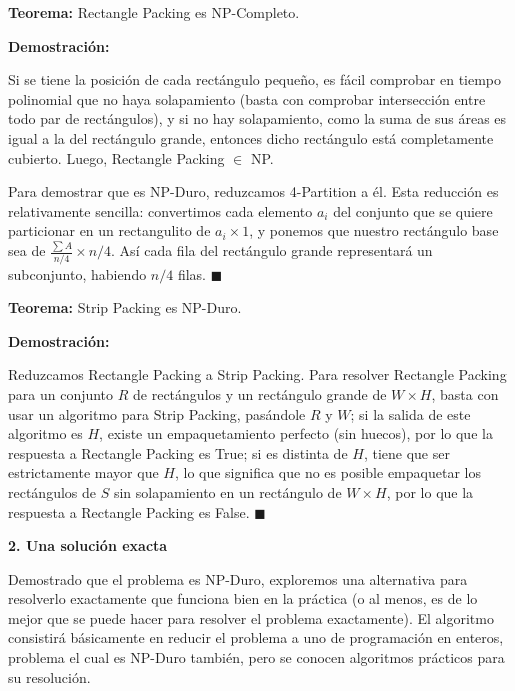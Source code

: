 \documentclass{article}
\begin{document}
\bigskip

\textbf{Teorema:} Rectangle Packing es NP-Completo.

\smallskip

\textbf{Demostración:}

\bigskip

Si se tiene la posición de cada rectángulo pequeño, es fácil comprobar en tiempo polinomial que no haya solapamiento (basta con comprobar intersección entre todo par de rectángulos), y si no hay solapamiento, como la suma de sus áreas es igual a la del rectángulo grande, entonces dicho rectángulo está completamente cubierto. Luego, Rectangle Packing $\in$ NP.

\bigskip

Para demostrar que es NP-Duro, reduzcamos 4-Partition a él. Esta reducción es relativamente sencilla: convertimos cada elemento $a_i$ del conjunto que se quiere particionar en un rectangulito de $a_i \times 1$, y ponemos que nuestro rectángulo base sea de $\frac{\sum A}{n/4} \times n/4$. Así cada fila del rectángulo grande representará un subconjunto, habiendo $n/4$ filas. $\blacksquare$

\bigskip

\textbf{Teorema:} Strip Packing es NP-Duro.

\smallskip

\textbf{Demostración:}

\bigskip

Reduzcamos Rectangle Packing a Strip Packing. Para resolver Rectangle Packing para un conjunto $R$ de rectángulos y un rectángulo grande de $W \times H$, basta con usar un algoritmo para Strip Packing, pasándole $R$ y $W$; si la salida de este algoritmo es $H$, existe un empaquetamiento perfecto (sin huecos), por lo que la respuesta a Rectangle Packing es True; si es distinta de $H$, tiene que ser estrictamente mayor que $H$, lo que significa que no es posible empaquetar los rectángulos de $S$ sin solapamiento en un rectángulo de $W \times H$, por lo que la respuesta a Rectangle Packing es False. $\blacksquare$



\bigskip

\center
\textbf{2. Una solución exacta}

\raggedright
\smallskip

Demostrado que el problema es NP-Duro, exploremos una alternativa para resolverlo exactamente que funciona bien en la práctica (o al menos, es de lo mejor que se puede hacer para resolver el problema exactamente). El algoritmo consistirá básicamente en reducir el problema a uno de programación en enteros, problema el cual es NP-Duro también, pero se conocen algoritmos prácticos para su resolución.
\end{document}
